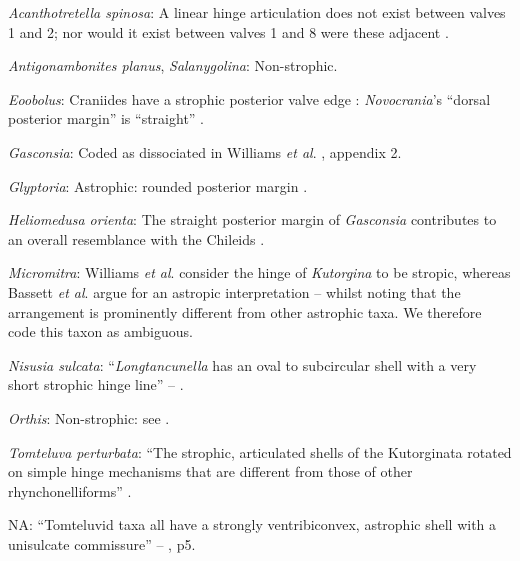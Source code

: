 \documentclass[openany]{book}
\theoremstyle{definition}
\theoremstyle{definition}
\theoremstyle{definition}
\theoremstyle{remark}
\begin{document}
\hypertarget{Acanthotretella_spinosa-coding-65}{}
\emph{Acanthotretella spinosa}: A linear hinge articulation does not
exist between valves 1 and 2; nor would it exist between valves 1 and 8
were these adjacent \citep{Connors2012}.

\hypertarget{Antigonambonites_planus-coding-65}{}
\emph{Antigonambonites planus}, \emph{Salanygolina}: Non-strophic.

\hypertarget{Eoobolus-coding-65}{}
\emph{Eoobolus}: Craniides have a strophic posterior valve edge
\citep[table 39 on p.~2853]{Williams2007Supplement}: \emph{Novocrania}'s
``dorsal posterior margin'' is ``straight''
\citep[p.~171]{Williams2000LinguliformeaCraniiformea}.

\hypertarget{Gasconsia-coding-65}{}
\emph{Gasconsia}: Coded as dissociated in Williams \emph{et al}.
\citeyearpar{Williams1998Thediversity}, appendix 2.

\hypertarget{Glyptoria-coding-65}{}
\emph{Glyptoria}: Astrophic: rounded posterior margin \citep[see fig. 91
in][]{Williams2000LinguliformeaCraniiformea}.

\hypertarget{Heliomedusa_orienta-coding-65}{}
\emph{Heliomedusa orienta}: The straight posterior margin of
\emph{Gasconsia} contributes to an overall resemblance with the Chileids
\citep{Holmer2014Ordovician96}.

\hypertarget{Micromitra-coding-65}{}
\emph{Micromitra}: Williams \emph{et al}.
\citeyearpar[p.~208]{Williams2000LinguliformeaCraniiformea} consider the
hinge of \emph{Kutorgina} to be stropic, whereas Bassett \emph{et al}.
\citeyearpar{Bassett2001Functionalmorphology} argue for an astropic
interpretation -- whilst noting that the arrangement is prominently
different from other astrophic taxa. We therefore code this taxon as
ambiguous.

\hypertarget{Nisusia_sulcata-coding-65}{}
\emph{Nisusia sulcata}: ``\emph{Longtancunella} has an oval to
subcircular shell with a very short strophic hinge line'' --
\citet{Zhang2011Theexceptionally}.

\hypertarget{Orthis-coding-65}{}
\emph{Orthis}: Non-strophic: see \citet{Holmer2008TheEarly}.

\hypertarget{Tomteluva_perturbata-coding-65}{}
\emph{Tomteluva perturbata}: ``The strophic, articulated shells of the
Kutorginata rotated on simple hinge mechanisms that are different from
those of other rhynchonelliforms''
\citep[p.~208]{Williams2000LinguliformeaCraniiformea}.

\hypertarget{NA-coding-65}{}
NA: ``Tomteluvid taxa all have a strongly ventribiconvex, astrophic
shell with a unisulcate commissure'' -- \citet{Streng2016Anew}, p5.
\end{document}
